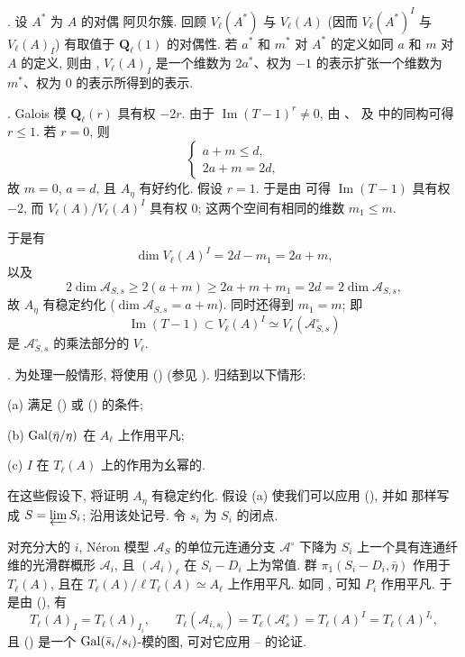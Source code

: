 . 设 $A^*$ 为 $A$ 的对偶 阿贝尔簇. 回顾 $V_\ell(A^*)$ 与 $V_\ell(A)$ (因而 $V_\ell(A^*)^I$ 与 $V_\ell(A)_I$) 有取值于 $\mathbf Q_\ell(1)$ 的对偶性. 若 $a^*$ 和 $m^*$ 对 $A^*$ 的定义如同 $a$ 和 $m$ 对 $A$ 的定义, 则由 , $V_\ell(A)_I$ 是一个维数为 $2a^*$、权为 $-1$ 的表示扩张一个维数为 $m^*$、权为 $0$ 的表示所得到的表示.

. Galois 模 $\mathbf Q_\ell(r)$ 具有权 $-2r$. 由于 $\operatorname{Im}(T-1)^r\neq 0$, 由 、 及  中的同构可得 $r\leq 1$. 若 $r=0$, 则
\[
\left\{
\begin{array}{l}
a+m\leq d,\\[1ex]
2a+m=2d,
\end{array}
\right.
\]
故 $m=0$, $a=d$, 且 $A_\eta$ 有好约化. 假设 $r=1$. 于是由  可得 $\operatorname{Im}(T-1)$ 具有权 $-2$, 而 $V_\ell(A)/V_\ell(A)^I$ 具有权 $0$; 这两个空间有相同的维数 $m_1\leq m$.

于是有
\[
 \dim V_\ell(A)^I=2d-m_1=2a+m,
\]
以及
\[
 2\dim\mathcal A_{S,s}\geq 2(a+m)\geq
 2a+m+m_1=2d=2\dim\mathcal A_{S,s},
\]
故 $A_\eta$ 有稳定约化 ($\dim\mathcal A_{S,s}=a+m$). 同时还得到 $m_1=m$; 即
\[
 \operatorname{Im}(T-1)\subset V_\ell(A)^I\simeq
 V_\ell(\mathcal A^\circ_{S,s})
\]
是 $\mathcal A^\circ_{S,s}$ 的乘法部分的 $V_\ell$.

. 为处理一般情形, 将使用 () (参见 ). 归结到以下情形:


(a) 满足 () 或 () 的条件;

(b) $\operatorname{Gal}(\bar\eta/\eta)$ 在 $A_\ell$ 上作用平凡;

(c) $I$ 在 $T_\ell(A)$ 上的作用为幺幂的.

在这些假设下, 将证明 $A_\eta$ 有稳定约化. 假设 (a) 使我们可以应用 (), 并如  那样写成 $S=\varprojlim S_i$; 沿用该处记号. 令 $s_i$ 为 $S_i$ 的闭点.

对充分大的 $i$, N\'eron 模型 $\mathcal A_S$ 的单位元连通分支 $\mathcal A^\circ$ 下降为 $S_i$ 上一个具有连通纤维的光滑群概形 $\mathcal A_i$, 且 $(\mathcal A_i)_\ell$ 在 $S_i-D_i$ 上为常值. 群 $\pi_1(S_i-D_i,\bar\eta)$ 作用于 $T_\ell(A)$, 且在 $T_\ell(A)/\ell T_\ell(A)\simeq A_\ell$ 上作用平凡. 如同 , 可知 $P_i$ 作用平凡. 于是由 (), 有
\[
 T_\ell(A)_I=T_\ell(A)_{I_i},\qquad
 T_\ell(\mathcal A_{i,s_i})=T_\ell(\mathcal A^\circ_s)
 =T_\ell(A)^I=T_\ell(A)^{I_i},
\]
且 () 是一个 $\operatorname{Gal}(\bar s_i/s_i)$-模的图, 可对它应用 -- 的论证.

